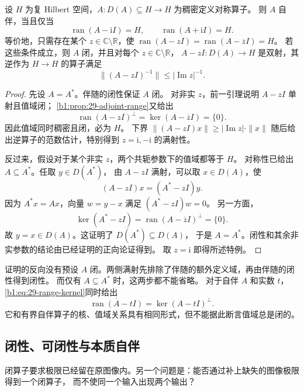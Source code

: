 \begin{theorem}[自伴性的非实点满射判据]
\label{b1:thm:29-self-adjoint-criterion}
设 \(H\) 为复 Hilbert 空间，\(A:D(A)\subseteq H\to H\) 为稠密定义对称算子。
则 \(A\) 自伴，当且仅当
\[
 \operatorname{ran}(A-\mathrm iI)=H,
 \qquad \operatorname{ran}(A+\mathrm iI)=H.
\]
等价地，只需存在某个 \(z\in\mathbb C\setminus\mathbb R\)，使
\(\operatorname{ran}(A-zI)=\operatorname{ran}(A-\overline zI)=H\)。
若这些条件成立，则 \(A\) 闭，并且对每个 \(z\in\mathbb C\setminus\mathbb R\)，
\(A-zI:D(A)\to H\) 是双射，其逆作为 \(H\to H\) 的算子满足
\begin{equation}\label{b1:eq:29-unbounded-resolvent-bound}
 \|(A-zI)^{-1}\|\leq |\operatorname{Im}z|^{-1}.
\end{equation}
\end{theorem}
\begin{proof}
先设 \(A=A^*\)。伴随的闭性保证 \(A\) 闭。
对非实 \(z\)，前一引理说明 \(A-zI\) 单射且值域闭；
\cref{b1:prop:29-adjoint-range}又给出
\[
 \operatorname{ran}(A-zI)^\perp
 =\ker(A-\overline zI)=\{0\}.
\]
因此值域同时稠密且闭，必为 \(H\)。
下界 \(\|(A-zI)x\|\geq|\operatorname{Im}z|\cdot\|x\|\)
随后给出逆算子的范数估计，特别得到 \(z=\mathrm i,-\mathrm i\) 的满射性。

反过来，假设对于某个非实 \(z\)，两个共轭参数下的值域都等于 \(H\)。
对称性已给出 \(A\subseteq A^*\)。任取 \(y\in D(A^*)\)，
由 \(A-zI\) 满射，可以取 \(x\in D(A)\)，使
\[
 (A-zI)x=(A^*-zI)y.
\]
因为 \(A^*x=Ax\)，向量 \(w=y-x\) 满足 \((A^*-zI)w=0\)。
另一方面，
\[
 \ker(A^*-zI)=\operatorname{ran}(A-\overline zI)^\perp=\{0\}.
\]
故 \(y=x\in D(A)\)。这证明了 \(D(A^*)\subseteq D(A)\)，
于是 \(A=A^*\)。闭性和其余非实参数的结论由已经证明的正向论证得到。
取 \(z=\mathrm i\) 即得所述特例。
\end{proof}

证明的反向没有预设 \(A\) 闭。两侧满射先排除了伴随的额外定义域，再由伴随的闭性得到闭性。
而仅有 \(A\subseteq A^*\) 时，这两步都不能省略。
对于自伴 \(A\) 和实数 \(t\)，\eqref{b1:eq:29-range-kernel}同时给出
\[
 \overline{\operatorname{ran}(A-tI)}=\ker(A-tI)^\perp.
\]
它和有界自伴算子的核、值域关系具有相同形式，但不能据此断言值域总是闭的。

\subsection{闭性、可闭性与本质自伴}
\label{b1:subsec:290504}

闭算子要求极限已经留在原图像内。另一个问题是：能否通过补上缺失的图像极限得到一个闭算子，
而不使同一个输入出现两个输出？

